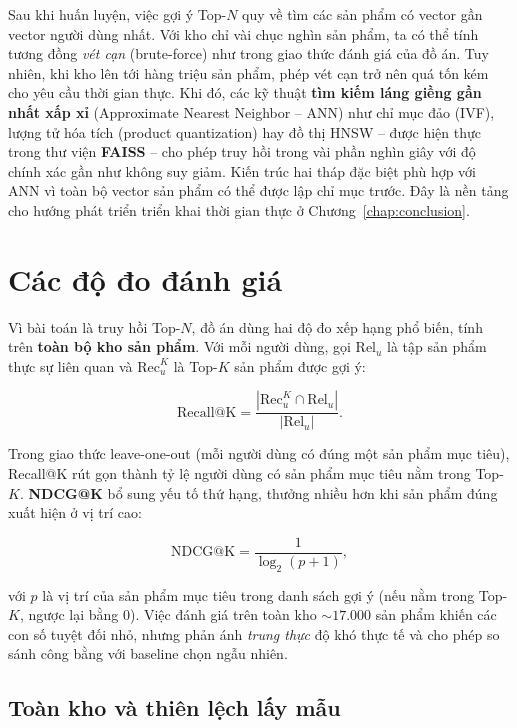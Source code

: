 Sau khi huấn luyện, việc gợi ý Top-$N$ quy về tìm các sản phẩm có vector gần vector
người dùng nhất. Với kho chỉ vài chục nghìn sản phẩm, ta có thể tính tương đồng
\textit{vét cạn} (brute-force) như trong giao thức đánh giá của đồ án. Tuy nhiên, khi
kho lên tới hàng triệu sản phẩm, phép vét cạn trở nên quá tốn kém cho yêu cầu thời
gian thực. Khi đó, các kỹ thuật \textbf{tìm kiếm láng giềng gần nhất xấp xỉ}
(Approximate Nearest Neighbor -- ANN) như chỉ mục đảo (IVF), lượng tử hóa tích
(product quantization) hay đồ thị HNSW -- được hiện thực trong thư viện
\textbf{FAISS} -- cho phép truy hồi trong vài phần nghìn giây với độ chính xác gần
như không suy giảm. Kiến trúc hai tháp đặc biệt phù hợp với ANN vì toàn bộ vector
sản phẩm có thể được lập chỉ mục trước. Đây là nền tảng cho hướng phát triển triển
khai thời gian thực ở Chương~\ref{chap:conclusion}.

\section{Các độ đo đánh giá}
\label{sec:metrics}

Vì bài toán là truy hồi Top-$N$, đồ án dùng hai độ đo xếp hạng phổ biến, tính trên
\textbf{toàn bộ kho sản phẩm}. Với mỗi người dùng, gọi $\text{Rel}_u$ là tập sản
phẩm thực sự liên quan và $\text{Rec}_u^K$ là Top-$K$ sản phẩm được gợi ý:

\begin{equation}
    \text{Recall@K} = \frac{|\text{Rec}_u^K \cap \text{Rel}_u|}{|\text{Rel}_u|}.
\end{equation}

Trong giao thức leave-one-out (mỗi người dùng có đúng một sản phẩm mục tiêu),
Recall@K rút gọn thành tỷ lệ người dùng có sản phẩm mục tiêu nằm trong Top-$K$.
\textbf{NDCG@K} bổ sung yếu tố thứ hạng, thưởng nhiều hơn khi sản phẩm đúng xuất hiện
ở vị trí cao:

\begin{equation}
    \text{NDCG@K} = \frac{1}{\log_2(p + 1)},
\end{equation}

với $p$ là vị trí của sản phẩm mục tiêu trong danh sách gợi ý (nếu nằm trong Top-$K$,
ngược lại bằng $0$). Việc đánh giá trên toàn kho $\sim 17.000$ sản phẩm khiến các
con số tuyệt đối nhỏ, nhưng phản ánh \textit{trung thực} độ khó thực tế và cho phép
so sánh công bằng với baseline chọn ngẫu nhiên.

\subsection{Toàn kho và thiên lệch lấy mẫu}
\label{sec:fullcatalog}

